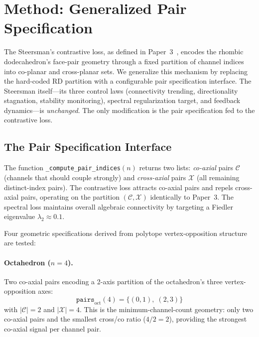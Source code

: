 \section{Method: Generalized Pair Specification}
\label{sec:method}

The Steersman's contrastive loss, as defined in
Paper~3~\cite{bielec2026bridge}, encodes the rhombic dodecahedron's
face-pair geometry through a fixed partition of channel indices into
co-planar and cross-planar sets.  We generalize this mechanism by
replacing the hard-coded RD partition with a configurable pair
specification interface.  The Steersman itself---its three control laws
(connectivity trending, directionality stagnation, stability
monitoring), spectral regularization target, and feedback dynamics---is
\emph{unchanged}.  The only modification is the pair specification fed
to the contrastive loss.

\subsection{The Pair Specification Interface}
\label{sec:pairs}

The function \texttt{\_compute\_pair\_indices}$(n)$ returns two
lists: \emph{co-axial} pairs $\mathcal{C}$ (channels that should
couple strongly) and \emph{cross-axial} pairs $\mathcal{X}$ (all
remaining distinct-index pairs).  The contrastive loss attracts
co-axial pairs and repels cross-axial pairs, operating on the
partition $(\mathcal{C}, \mathcal{X})$ identically to Paper~3.
The spectral loss maintains overall algebraic connectivity by
targeting a Fiedler eigenvalue $\lambda_2 \approx 0.1$.

Four geometric specifications derived from polytope vertex-opposition
structure are tested:

\paragraph{Octahedron ($n{=}4$).}
Two co-axial pairs encoding a 2-axis partition of the octahedron's
three vertex-opposition axes:
\begin{equation}
  \texttt{pairs}_{\text{oct}}(4) = \{(0,1),\; (2,3)\}
  \label{eq:oct_pairs}
\end{equation}
with $|\mathcal{C}| = 2$ and $|\mathcal{X}| = 4$.  This is the
minimum-channel-count geometry: only two co-axial pairs and the
smallest cross/co ratio ($4/2 = 2$), providing the strongest co-axial
signal per channel pair.

